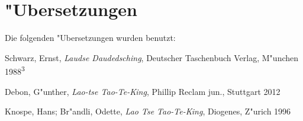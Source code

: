 \documentclass[a4paper,10pt,openany]{book}
\begin{document}

\appendix
\chapter{"Ubersetzungen}

Die folgenden "Ubersetzungen wurden benutzt:

\begin{description}
\item Schwarz, Ernst, \textit{Laudse Daudedsching}, Deutscher Taschenbuch Verlag, M"unchen 1988\textsuperscript{3}
\item Debon, G"unther, \textit{Lao-tse Tao-Te-King}, Phillip Reclam jun., Stuttgart 2012
\item Knospe, Hans; Br"andli, Odette, \textit{Lao Tse Tao-Te-King}, Diogenes, Z"urich 1996
\end{description}
\end{document}
